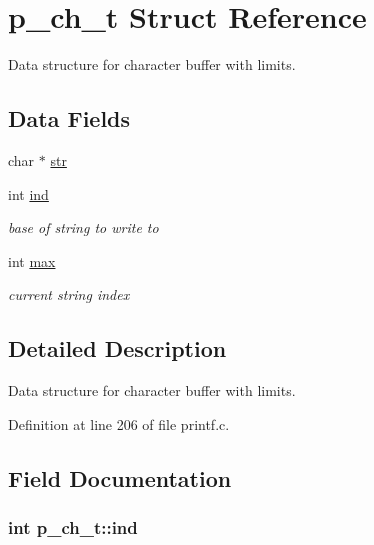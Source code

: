 \hypertarget{structp__ch__t}{}\section{p\+\_\+ch\+\_\+t Struct Reference}
\label{structp__ch__t}


Data structure for character buffer with limits.  


\subsection*{Data Fields}
\begin{DoxyCompactItemize}
\item 
char $\ast$ \hyperlink{structp__ch__t_aa3c8616342a2717bc714bf1b6d00516f}{str}
\item 
int \hyperlink{structp__ch__t_a9d6834d749cd9232a16cb20b598fe90d}{ind}
\begin{DoxyCompactList}\small\item\em base of string to write to \end{DoxyCompactList}\item 
int \hyperlink{structp__ch__t_a0dee9f28e498d427e53051b7e1846d34}{max}
\begin{DoxyCompactList}\small\item\em current string index \end{DoxyCompactList}\end{DoxyCompactItemize}


\subsection{Detailed Description}
Data structure for character buffer with limits. 

Definition at line 206 of file printf.\+c.



\subsection{Field Documentation}
\subsubsection[{\texorpdfstring{ind}{ind}}]{\setlength{\rightskip}{0pt plus 5cm}int p\+\_\+ch\+\_\+t\+::ind}\hypertarget{structp__ch__t_a9d6834d749cd9232a16cb20b598fe90d}{}\label{structp__ch__t_a9d6834d749cd9232a16cb20b598fe90d}


